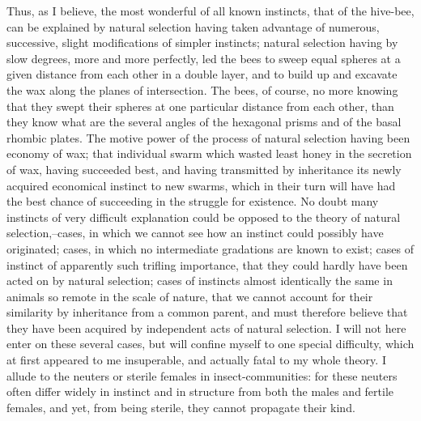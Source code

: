 Thus, as I believe, the most wonderful of all known instincts, that of the hive-bee, can be explained by natural selection having taken advantage of numerous, successive, slight modifications of simpler instincts; natural selection having by slow degrees, more and more perfectly, led the bees to sweep equal spheres at a given distance from each other in a double layer, and to build up and excavate the wax along the planes of intersection. The bees, of course, no more knowing that they swept their spheres at one particular distance from each other, than they know what are the several angles of the hexagonal prisms and of the basal rhombic plates. The motive power of the process of natural selection having been economy of wax; that individual swarm which wasted least honey in the secretion of wax, having succeeded best, and having transmitted by inheritance its newly acquired economical instinct to new swarms, which in their turn will have had the best chance of succeeding in the struggle for existence.
No doubt many instincts of very difficult explanation could be opposed to the theory of natural selection,--cases, in which we cannot see how an instinct could possibly have originated; cases, in which no intermediate gradations are known to exist; cases of instinct of apparently such trifling importance, that they could hardly have been acted on by natural selection; cases of instincts almost identically the same in animals so remote in the scale of nature, that we cannot account for their similarity by inheritance from a common parent, and must therefore believe that they have been acquired by independent acts of natural selection. I will not here enter on these several cases, but will confine myself to one special difficulty, which at first appeared to me insuperable, and actually fatal to my whole theory. I allude to the neuters or sterile females in insect-communities: for these neuters often differ widely in instinct and in structure from both the males and fertile females, and yet, from being sterile, they cannot propagate their kind.
